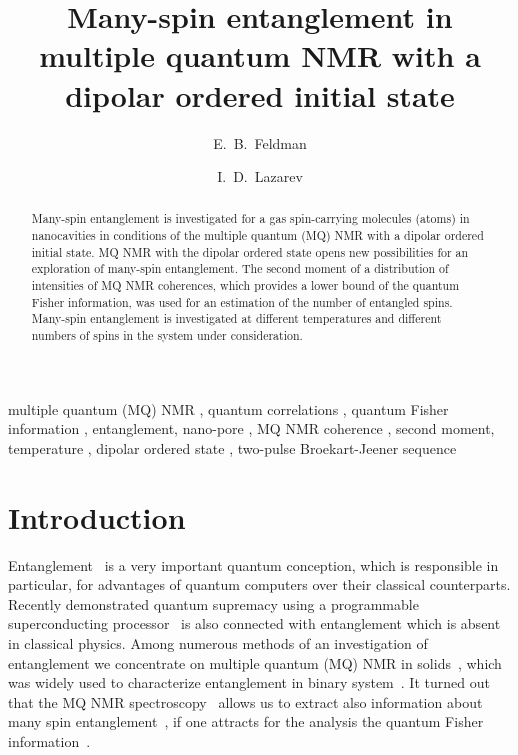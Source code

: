 \documentclass[review]{elsarticle}
\begin{document}
\begin{frontmatter}

\title{Many-spin entanglement in multiple quantum NMR with a dipolar ordered initial state}

\author[icp]{E.~B.~Feldman}
\author[icp,msu]{I.~D.~Lazarev} %

\address[icp]{Institute of Problems of Chemical Physics of Russian Academy of Sciences, \\ Chernogolovka, Moscow Region, Russia 142432}
\address[msu]{Faculty of Fundamental Physical-Chemical Engineering, Lomonosov Moscow State University, GSP-1, Moscow, Russia 119991}



\begin{abstract}
Many-spin entanglement is investigated for a gas spin-carrying molecules (atoms) in nanocavities 
in conditions of the multiple quantum (MQ) NMR with a dipolar ordered initial state.
MQ NMR with the dipolar ordered state opens new possibilities for an exploration of many-spin entanglement. 
The second moment of a distribution of intensities of MQ NMR coherences,
which provides a lower bound of the quantum Fisher information, 
was used for an estimation of the number of entangled spins. 
Many-spin entanglement is investigated at different temperatures and different numbers of spins in the system under consideration.
\end{abstract}

\begin{keyword}
multiple quantum (MQ) NMR \sep  
quantum correlations \sep 
quantum Fisher information \sep 
entanglement, nano-pore \sep 
MQ NMR coherence \sep 
second moment, temperature \sep 
dipolar ordered state \sep 
two-pulse Broekart-Jeener sequence
\end{keyword}

\end{frontmatter}

\linenumbers

\section{Introduction}
\label{sec:1}

Entanglement~\cite{Nielsen_2009} is a very important quantum conception, which is responsible in particular, for advantages of quantum computers over their classical counterparts.
Recently demonstrated quantum supremacy using a programmable superconducting processor~\cite{Arute2019} is also connected with entanglement which is absent in classical physics.
Among numerous methods of an investigation of entanglement we concentrate on multiple quantum (MQ) NMR in solids~\cite{Baum_1985}, which was widely used to characterize entanglement in binary system~\cite{Furman_2008,Furman_2009,Fel_dman_2008,Fel_dman_2012}. 
It turned out that the MQ NMR spectroscopy~\cite{Baum_1985} allows us to extract also information about many spin entanglement~\cite{G_rttner_2018}, 
if one attracts for the analysis the quantum Fisher information~\cite{T_th_2014,Pezz__2018}.
\end{document}
